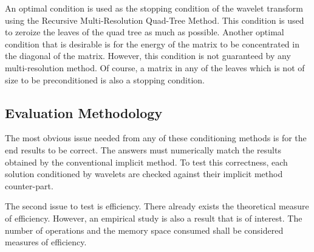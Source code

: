 An optimal condition is used as the stopping condition of the wavelet transform using the Recursive Multi-Resolution Quad-Tree Method.   %
This condition is used to zeroize the leaves of the quad tree as much as possible.  %
Another optimal condition that is desirable is for the energy of the matrix to be concentrated in the diagonal of the matrix.  However, this condition is not guaranteed by any multi-resolution method.   Of course, a matrix in any of the leaves which is not of size to be preconditioned is also a stopping condition.  



\subsection {Evaluation Methodology}
The most obvious issue needed from any of %
 these conditioning methods is for the end results to be correct.  The answers must numerically match the results obtained by the conventional implicit method.  To test this correctness, each solution conditioned by wavelets are checked against their implicit method counter-part.  

The second issue to test is efficiency.  There already exists the theoretical measure of efficiency.  However, an empirical study is also a result that is of interest.  The number of operations and the memory space consumed shall be considered measures of efficiency.  





